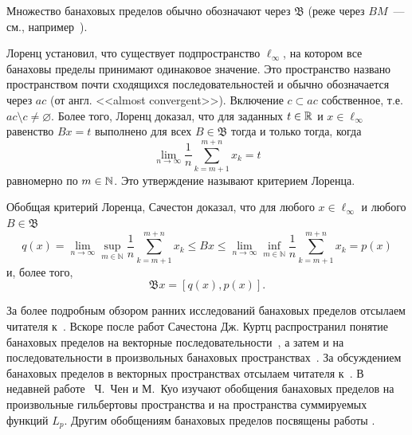 Множество банаховых пределов обычно обозначают через $\mathfrak{B}$
(реже через $BM$~--- см., например~\cite{alekhno2012superposition,alekhno2015banach}).

Лоренц \cite{lorentz1948contribution} установил, что существует подпространство $\ell_\infty$,
на котором все банаховы пределы принимают одинаковое значение.
Это пространство названо пространством почти сходящихся последовательностей и обычно обозначается через $ac$
(от англ. <<almost convergent>>).
Включение $c \subset ac$ собственное, т.е. $ac \setminus c \neq \varnothing$.
Более того, Лоренц доказал, что для заданных $t\in\mathbb{R}$ и $x\in\ell_\infty$ равенство $Bx=t$ выполнено для всех $B\in\mathfrak{B}$
тогда и только тогда, когда
\begin{equation}
	\label{eq:crit_Lorentz}
	\lim_{n\to\infty} \frac{1}{n} \sum_{k=m+1}^{m+n} x_k = t
\end{equation}
равномерно по $m\in\mathbb{N}$.
Это утверждение называют критерием Лоренца.


Обобщая критерий Лоренца, Сачестон \cite{sucheston1967banach} доказал, что для любого $x\in\ell_\infty$
и любого $B\in\mathfrak{B}$
\begin{equation*}
	q(x) =
	\lim_{n\to\infty} \sup_{m\in\mathbb{N}} \frac{1}{n} \sum_{k=m+1}^{m+n} x_k
	\leq
	Bx
	\leq
	\lim_{n\to\infty} \inf_{m\in\mathbb{N}} \frac{1}{n} \sum_{k=m+1}^{m+n} x_k
	= p(x)
\end{equation*}
и, более того,
\begin{equation*}
	\mathfrak{B}x = [q(x), p(x)]
	.
\end{equation*}


За более подробным обзором ранних исследований банаховых пределов отсылаем читателя к~\cite{greenleaf1969invariant,day1973normed,kangro1976theory}.
Вскоре после работ Сачестона Дж. Куртц распространил понятие банаховых пределов
на векторные последовательности~\cite{kurtz1970almost},
а затем и на последовательности в произвольных банаховых пространствах~\cite{kurtz1972almost}.
За обсуждением банаховых пределов в векторных пространствах отсылаем читателя
к~\cite{deeds1968summability,hajdukovic1975almost,armario2013vectorvalued_rus,garcia2015extremal,garcia2016fundamental_rus}.
В недавней работе~\cite{chen2007characterizations} Ч.~Чен и М.~Куо изучают обобщения банаховых пределов
на произвольные гильбертовы пространства и на пространства суммируемых функций $L_p$.
Другим обобщениям банаховых пределов посвящены работы
\cite{hajdukovic1975functionals,koga2016generalization}.

